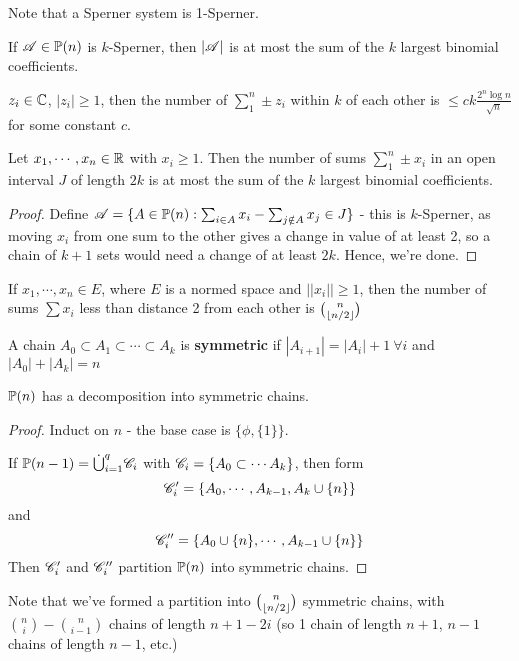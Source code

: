 \documentclass[a4paper]{article}
\begin{document}
Note that a Sperner system is 1-Sperner.

\begin{cor-num}[Erd\H{o}s, 1945]
	If $\A\in\P(n)$ is $k$-Sperner, then $|\A|$ is at most the sum of the $k$ largest binomial coefficients.
\end{cor-num}

\begin{thm}
	$z_i\in\C$, $\left|z_i\right|\geq 1$, then the number of $\sum_1^n\pm z_i$ within $k$ of each other is $\leq ck\frac{2^n\log n}{\sqrt{n}}$ for some constant $c$.
\end{thm}

\begin{thm-num}[Erd\H{o}s, 1945]
	Let $x_1,\cdots, x_n\in\R$ with $x_i\geq1$. Then the number of sums $\sum_1^n\pm x_i$ in an open interval $J$ of length $2k$ is at most the sum of the $k$ largest binomial coefficients.
\end{thm-num}
\begin{proof}
	Define $\A=\{A\in\P(n) : \sum_{i\in A}x_i - \sum_{j\notin A}x_j\in J\}$ - this is $k$-Sperner, as moving $x_i$ from one sum to the other gives a change in value of at least 2, so a chain of $k+1$ sets would need a change of at least $2k$. Hence, we're done.
\end{proof}

\begin{conj}[Erd\H{o}s, 1945]
	If $x_1,\cdots,x_n\in E$, where $E$ is a normed space and $\left|\left|x_i\right|\right|\geq1$, then the number of sums $\sum x_i$ less than distance 2 from each other is $\binom{n}{\lf n/2 \rf}$
\end{conj}

\begin{defi}
	A chain $A_0\subset A_1\subset \cdots \subset A_k$ is \textbf{symmetric} if $\left|A_{i+1}\right|=\left|A_{i}\right|+1\ \forall i$ and $\left|A_0\right|+\left|A_k\right|=n$
\end{defi}

\begin{thm-num}
	$\P(n)$ has a decomposition into symmetric chains.
\end{thm-num}
\begin{proof}
	Induct on $n$ - the base case is $\{\phi,\{1\}\}$.
	
	If $\P(n-1)=\dot{\bigcup}_{i=1}^{q}\calC_i$ with $\calC_i = \left\{A_0\subset\cdots A_k\right\}$, then form $$\calC_i'=\left\{A_0,\cdots,A_{k-1},A_k\cup\{n\}\right\}$$
	and $$\calC_i''=\left\{A_0\cup\{n\},\cdots,A_{k-1}\cup\{n\}\right\}$$
	Then $\calC_i'$ and $\calC_i''$ partition $\P(n)$ into symmetric chains.
\end{proof}
\begin{rem}
	Note that we've formed a partition into $\binom{n}{\lf n/2\rf}$ symmetric chains, with $\binom{n}{i}-\binom{n}{i-1}$ chains of length $n+1-2i$ (so 1 chain of length $n+1$, $n-1$ chains of length $n-1$, etc.)
\end{rem}
\end{document}
